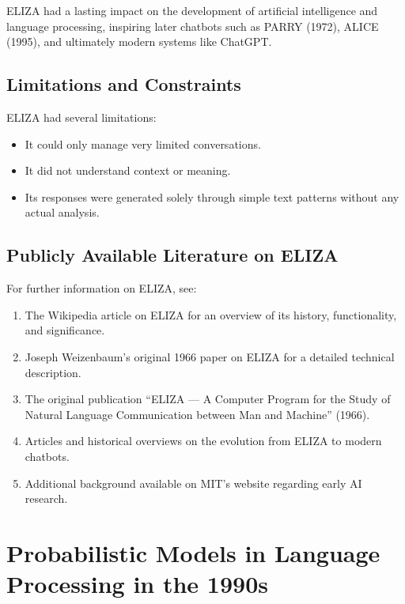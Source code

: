 ELIZA had a lasting impact on the development of artificial intelligence and language
processing, inspiring later chatbots such as PARRY (1972), ALICE (1995), and ultimately
modern systems like ChatGPT.

\subsection{Limitations and Constraints}

ELIZA had several limitations:
\begin{itemize}
  \item It could only manage very limited conversations.
  \item It did not understand context or meaning.
  \item Its responses were generated solely through simple text patterns without any
        actual analysis.
\end{itemize}

\subsection{Publicly Available Literature on ELIZA}

For further information on ELIZA, see:
\begin{enumerate}
  \item The Wikipedia article on ELIZA for an overview of its history, functionality, and
        significance.
  \item Joseph Weizenbaum’s original 1966 paper on ELIZA for a detailed technical description.
  \item The original publication “ELIZA --- A Computer Program for the Study of Natural
        Language Communication between Man and Machine” (1966).
  \item Articles and historical overviews on the evolution from ELIZA to modern chatbots.
  \item Additional background available on MIT’s website regarding early AI research.
\end{enumerate}


\section{Probabilistic Models in Language Processing in the 1990s}

